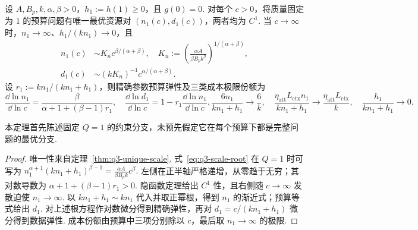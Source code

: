 \begin{theorem}[质量饱和约束分支的高预算极限分配]\label{thm:q3-asymptotic}
设 $A,B_p,k,\alpha,\beta>0$，$h_1:=h(1)\ge0$，且 $g(0)=0$. 对每个 $c>0$，将质量固定为 $1$ 的预算问题有唯一最优资源对 $(n_1(c),d_1(c))$，两者均为 $C^1$. 当 $c\to\infty$ 时，$n_1\to\infty$、$h_1/(kn_1)\to0$，且
\begin{subequations}\label{eq:q3-asymptotic-v12}
    \begin{align}
n_1(c)&\sim K_n c^{\beta/(\alpha+\beta)},\quad K_n:=\left(\frac{\alpha A}{\beta B_pk^\beta}\right)^{1/(\alpha+\beta)},\\
d_1(c)&\sim(kK_n)^{-1}c^{\alpha/(\alpha+\beta)}.
\end{align}
\end{subequations}
设 $r_1:=kn_1/(kn_1+h_1)$，则精确参数预算弹性及三类成本极限份额为
\begin{subequations}\label{eq:q3-exact-elasticity-v26}
    \begin{equation}
\frac{\dd\ln n_1}{\dd\ln c}=\frac\beta{\alpha+1+(\beta-1)r_1},\quad  \frac{\dd\ln d_1}{\dd\ln c}=1-r_1\frac{\dd\ln n_1}{\dd\ln c},
  \end{equation}
  \begin{equation}
\frac{6 n_1}{kn_1+h_1}\longrightarrow\frac6k,\quad
\frac{\eta_{\mathrm{att}}L_{\mathrm{ctx}}n_1}{kn_1+h_1}\longrightarrow\frac{\eta_{\mathrm{att}}L_{\mathrm{ctx}}}k,
\quad \frac{h_1}{kn_1+h_1}\longrightarrow0.
\end{equation}
\end{subequations}

本定理首先陈述固定 $Q=1$ 的约束分支，未预先假定它在每个预算下都是完整问题的最优分支. 
\end{theorem}
\begin{proof}
唯一性来自定理~\ref{thm:q3-unique-scale}. 式~\eqref{eq:q3-scale-root} 在 $Q=1$ 时可写为
$n_1^{\alpha+1}(kn_1+h_1)^{\beta-1}=\frac{\alpha A}{\beta B_pk}c^\beta.$
左侧在正半轴严格递增，从零趋于无穷；其对数导数为 $\alpha+1+(\beta-1)r_1>0$. 隐函数定理给出 $C^1$ 性，且右侧随 $c\to\infty$ 发散迫使 $n_1\to\infty$. 以 $kn_1+h_1\sim kn_1$ 代入并取正幂根，得到 $n_1$ 的渐近式；预算等式给出 $d_1$. 对上述根方程作对数微分得到精确弹性，再对 $d_1=c/(kn_1+h_1)$ 微分得到数据弹性. 成本份额由预算中三项分别除以 $c$，最后取 $n_1\to\infty$ 的极限. 
\end{proof}

